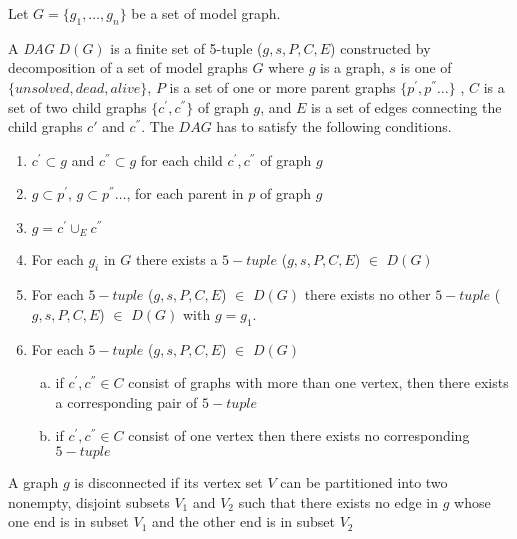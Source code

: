 Let $G=\{g_1 ,\ldots, g_n \}$ be a set of model graph. 
\begin{definition}
A \emph{DAG}  $D(G)$  is a finite set of 5-tuple ($g,s,P,C,E$) constructed by decomposition of a set of model graphs $G$ where $g$ is a graph, $s$ is one of $\{unsolved, dead, alive\}$,  $P$ is a set of one or more parent graphs $\{p^{'},p^{''}\ldots \}$ , $C$ is a set of two child graphs $\{c^{'},c^{''}\}$ of graph $g$, and $E$ is a set of edges connecting the child graphs $c{'}$ and $c^{''}$. 
The $DAG$ has to satisfy the following conditions.


\begin{enumerate}[(1)]
\item  $c^{'}\subset g$ and $c^{''} \subset g$ for each child  $c^{'},c^{''}$ of graph $g$
\item  $g \subset p^{'}$, $g \subset p^{''} \ldots$, for each parent in $p$ of graph $g$
\item $g=c^{'}\cup_{E} c^{''}$
\item For each $g_{i}$ in $G$ there exists a $5-tuple$ ($g,s,P,C,E$) $\in$ $D(G)$ 
\item For each  $5-tuple$ ($g,s,P,C,E$) $\in$ $D(G)$ there exists no other  $5-tuple$ ($g,s,P,C,E$) $\in$ $D(G)$ with $g=g_1$.
\item For each  $5-tuple$ ($g,s,P,C,E$) $\in$ $D(G)$

\begin{enumerate}[a.]
\item if $c^{'},c^{''} \in C$  consist of graphs with more than one vertex, then there exists a corresponding pair of  $5-tuple$ 
\item if $c^{'},c^{''} \in C$ consist of one vertex then there exists no corresponding $5-tuple$ 
\end{enumerate}

\end{enumerate}
\end{definition}

\begin{definition}
A graph $g$ is disconnected if its vertex set $V$ can be partitioned into two nonempty, disjoint subsets $V_1$ and $V_2$ such that there exists no edge in $g$ whose one end is in subset $V_1$ and the other end is in subset $V_2$
\end{definition}

